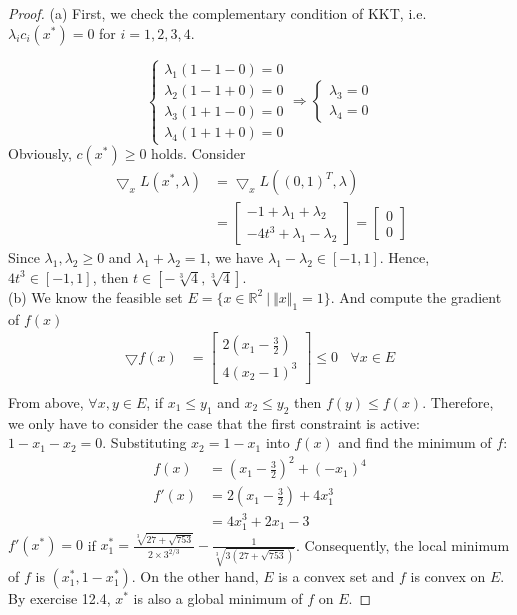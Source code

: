 \documentclass[11pt,a4paper]{article}
\renewcommand{\(}{\left(}
\renewcommand{\)}{\right)}
\begin{document}
  \begin{proof}
(a) First, we check the complementary condition of KKT, i.e. $\lambda_{i}c_{i}(x^{*})=0$ for $i=1,2,3,4.$

\begin{equation}
\begin{cases}
\lambda_{1}(1-1-0)=0\\
\lambda_{2}(1-1+0)=0\\
\lambda_{3}(1+1-0)=0\\
\lambda_{4}(1+1+0)=0
\end{cases}
\Rightarrow
\begin{cases}
\lambda_{3}=0\\
\lambda_{4}=0
\end{cases}
\end{equation}
Obviously, $c(x^{*})\geq0$ holds. Consider 
\begin{align*}
\bigtriangledown_{x}L(x^{*},\lambda)&=\bigtriangledown_{x}L((0,1)^{T},\lambda)\\
&=\begin{bmatrix}
-1+\lambda_{1}+\lambda_{2}\\
-4t^{3}+\lambda_{1}-\lambda_{2}
\end{bmatrix}
=\begin{bmatrix}
0\\0
\end{bmatrix}
\end{align*} 
Since $\lambda_{1}, \lambda_{2}\geq0$ and $\lambda_{1}+\lambda_{2}=1$, we have $\lambda_{1}-\lambda_{2}\in[-1,1]$. Hence, $4t^{3}\in[-1,1]$, then $t\in[-\sqrt[3]{4},\sqrt[3]{4}]$.\\
(b) We know the feasible set $E=\lbrace x\in \mathbb{R}^{2}~|~ \Vert x\Vert_{1}=1\rbrace$. And compute the gradient of $f(x)$
\begin{align*}
\bigtriangledown f(x) &= 
\begin{bmatrix}
2(x_{1}-\frac{3}{2})\\
4(x_{2}-1)^{3}
\end{bmatrix}
\leq 0~~~~\forall x\in E\\
\end{align*}
From above, $\forall x,y \in E$, if $x_{1}\leq y_{1}$ and $x_{2}\leq y_{2}$ then $f(y)\leq f(x)$. Therefore, we only have to  consider the case that the first constraint is active: $1-x_{1}-x_{2}=0$. Substituting $x_{2}=1-x_{1}$ into $f(x)$ and find the minimum of $f$:
\begin{align*}
f(x)&=(x_{1}-\frac{3}{2})^{2}+(-x_{1})^{4}\\
 f'(x)&=2(x_{1}-\frac{3}{2})+4x_{1}^{3}\\
&=4x_{1}^{3}+2x_{1}-3
\end{align*}
$f'(x^{*})=0$ if $x^{*}_{1}=\frac{\sqrt[3]{27+\sqrt{753}}}{2\times 3^{2/3}}-\frac{1}{\sqrt[3]{3(27+\sqrt{753})}}$.
Consequently, the local minimum of $f$ is $(x^{*}_{1},1-x^{*}_{1})$. On the other hand, $E$ is a convex set and $f$ is convex on $E$. By exercise 12.4, $x^{*}$ is also a global minimum of $f$ on $E$.
  \end{proof}
  \newpage
\end{document}
